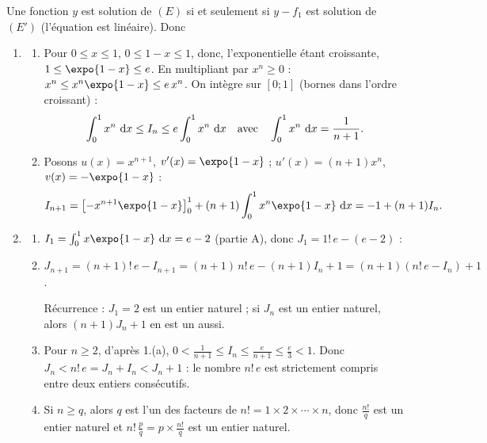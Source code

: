 \begin{description}
\begin{enumerate}
\begin{enumerate}
				Une fonction $y$ est solution de $(E)$ si et seulement si $y - f_1$ est solution de $(E')$ (l'équation est linéaire). Donc
				\par\noindent{}
		\end{enumerate}
	\end{enumerate}
	\item[Partie B]
	\begin{enumerate}
		\item
		\begin{enumerate}
			\item {}
				Pour $0 \leq x \leq 1$, $0 \leq 1 - x \leq 1$, donc, l'exponentielle étant croissante, $1 \leq \expo{1-x} \leq e$.
				En multipliant par $x^n \geq 0$ : $x^n \leq x^n \expo{1-x} \leq e\,x^n$. On intègre sur $[0;1]$ (bornes dans l'ordre croissant) :
				\[
					\int_0^1 x^n ~\mathrm{d}x \leq I_n \leq e\int_0^1 x^n ~\mathrm{d}x
					\quad\text{avec}\quad \int_0^1 x^n~\mathrm{d}x = \frac{1}{n+1} .
				\]
				\par\noindent{}
			\item {}
				Posons $u(x) = x^{n+1}$, $v'(x) = \expo{1-x}$ ; $u'(x) = (n+1)x^n$, $v(x) = -\expo{1-x}$ :
				\[
					I_{n+1} = \left[-x^{n+1}\expo{1-x}\right]_0^1 + (n+1)\int_0^1 x^n\expo{1-x}\dx = -1 + (n+1) I_n .
				\]
				\par\noindent{}
		\end{enumerate}
		\item
		\begin{enumerate}
			\item {}
				$I_1 = \int_0^1 x \expo{1-x}\dx = e - 2$ (partie A), donc $J_1 = 1!\, e - (e-2)$ : \par\noindent{}
			\item {}
				$J_{n+1} = (n+1)!\, e - I_{n+1} = (n+1)\, n!\, e - (n+1) I_n + 1 = (n+1)\left(n!\, e - I_n\right) + 1$.
				\par\noindent{}
				Récurrence : $J_1 = 2$ est un entier naturel ; si $J_n$ est un entier naturel, alors $(n+1)J_n + 1$ en est un aussi.
				\par\noindent{}
			\item {}
				Pour $n \geq 2$, d'après 1.(a), $0 < \frac{1}{n+1} \leq I_n \leq \frac{e}{n+1} \leq \frac{e}{3} < 1$.
				Donc $J_n < n!\, e = J_n + I_n < J_n + 1$ : le nombre $n!\, e$ est strictement compris entre deux entiers consécutifs.
				\par\noindent{}
			\item {}
				Si $n \geq q$, alors $q$ est l'un des facteurs de $n! = 1 \times 2 \times \cdots \times n$, donc $\frac{n!}{q}$ est un entier naturel et
				$n!\,\frac{p}{q} = p \times \frac{n!}{q}$ est un entier naturel.


\end{enumerate}
\end{enumerate}
\end{description}
